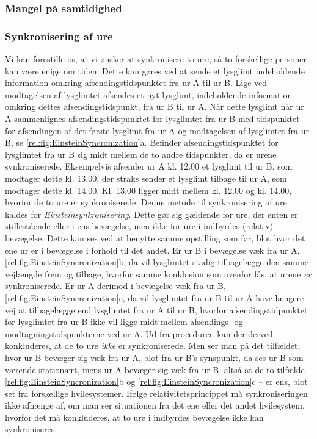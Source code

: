 \subsubsection{Mangel på samtidighed}\label{rel:sec:samtidighed}

\subsubsection{Synkronisering af ure} \label{rel:sec:sync}

Vi kan forestille os, at vi ønsker at synkronisere to ure, så to forskellige personer kan være enige om tiden. Dette kan gøres ved at sende et lysglimt indeholdende information omkring afsendingstidspunktet fra ur A til ur B. Lige ved modtagelsen af lysglimtet afsendes et nyt lysglimt, indeholdende information omkring dettes afsendingstidspunkt, fra ur B til ur A. Når dette lysglimt når ur A sammenlignes afsendingstidspunktet for lysglimtet fra ur B med tidspunktet for afsendingen af det første lysglimt fra ur A og modtagelsen af lysglimtet fra ur B, se \cref{rel:fig:EinsteinSyncronization}a. Befinder afsendingstidspunktet for lysglimtet fra ur B sig midt mellem de to andre tidspunkter, da er urene synkroniserede. Eksempelvis afsender ur A kl. 12.00 et lysglimt til ur B, som modtager dette kl. 13.00, der straks sender et lysglimt tilbage til ur A, som modtager dette kl. 14.00. Kl. 13.00 ligger midt mellem kl. 12.00 og kl. 14.00, hvorfor de to ure er synkroniserede. Denne metode til synkronisering af ure kaldes for \emph{Einsteinsynkronisering}. Dette gør sig gældende for ure, der enten er stillestående eller i ens bevægelse, men ikke for ure i indbyrdes (relativ) bevægelse. Dette kan ses ved at benytte samme opstilling som før, blot hvor det ene ur er i bevægelse i forhold til det andet. Er ur B i bevægelse væk fra ur A, \cref{rel:fig:EinsteinSyncronization}b, da vil lysglimtet stadig tilbagelægge den samme vejlængde frem og tilbage, hvorfor samme konklusion som ovenfor fås, at urene \emph{er} synkroniserede. Er ur A derimod i bevægelse væk fra ur B, \cref{rel:fig:EinsteinSyncronization}c, da vil lysglimtet fra ur B til ur A have længere vej at tilbagelægge end lysglimtet fra ur A til ur B, hvorfor afsendingstidpunktet for lysglimtet fra ur B ikke vil ligge midt mellem afsendings- og modtagningstidspunkterne ved ur A. Ud fra proceduren kan der derved konkluderes, at de to ure \emph{ikke} er synkroniserede. Men ser man på det tilfældet, hvor ur B bevæger sig væk fra ur A, blot fra ur B's synspunkt, da ses ur B som værende stationært, mens ur A bevæger sig væk fra ur B, altså at de to tilfælde -- \cref{rel:fig:EinsteinSyncronization}b og \ref{rel:fig:EinsteinSyncronization}c -- er ens, blot set fra forskellige hvilesystemer. Ifølge relativitetsprincippet må synkroniseringen ikke afhænge af, om man ser situationen fra det ene eller det andet hvilesystem, hvorfor det må konkluderes, at to ure i indbyrdes bevægelse ikke kan synkroniseres.

